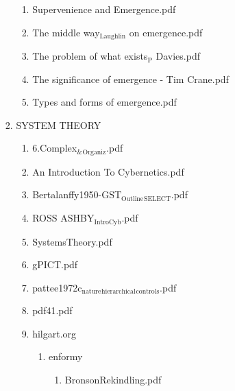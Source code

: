 \documentclass[11pt]{article}
\begin{document}
\begin{enumerate}
\begin{enumerate}
\begin{enumerate}
\begin{enumerate}
\item Supervenience and Emergence.pdf
\label{sec-1-1-1-1-11-8-5-1-9}

\item The middle way$_{\text{Laughlin}}$ on emergence.pdf
\label{sec-1-1-1-1-11-8-5-1-10}

\item The problem of what exists$_{\text{P}}$ Davies.pdf
\label{sec-1-1-1-1-11-8-5-1-11}

\item The significance of emergence - Tim Crane.pdf
\label{sec-1-1-1-1-11-8-5-1-12}

\item Types and forms of emergence.pdf
\label{sec-1-1-1-1-11-8-5-1-13}
\end{enumerate}

\item SYSTEM THEORY
\label{sec-1-1-1-1-11-8-5-2}
\begin{enumerate}
\item 6.Complex$_{\text{\&}}$$_{\text{Organiz}}$.pdf
\label{sec-1-1-1-1-11-8-5-2-1}

\item An Introduction To Cybernetics.pdf
\label{sec-1-1-1-1-11-8-5-2-2}

\item Bertalanffy1950-GST$_{\text{Outline}}$$_{\text{SELECT}}$.pdf
\label{sec-1-1-1-1-11-8-5-2-3}

\item ROSS ASHBY$_{\text{IntroCyb}}$.pdf
\label{sec-1-1-1-1-11-8-5-2-4}

\item SystemsTheory.pdf
\label{sec-1-1-1-1-11-8-5-2-5}

\item gPICT.pdf
\label{sec-1-1-1-1-11-8-5-2-6}

\item pattee1972c$_{\text{nature}}$$_{\text{hierarchical}}$$_{\text{controls}}$.pdf
\label{sec-1-1-1-1-11-8-5-2-7}

\item pdf41.pdf
\label{sec-1-1-1-1-11-8-5-2-8}

\item hilgart.org
\label{sec-1-1-1-1-11-8-5-2-9}
\begin{enumerate}
\item enformy
\label{sec-1-1-1-1-11-8-5-2-9-1}
\begin{enumerate}
\item BronsonRekindling.pdf
\label{sec-1-1-1-1-11-8-5-2-9-1-1}


\end{enumerate}
\end{enumerate}
\end{enumerate}
\end{enumerate}
\end{enumerate}
\end{enumerate}
\end{document}
